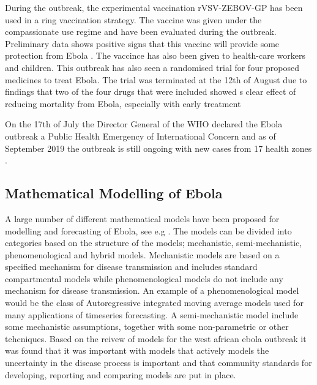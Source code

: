 \documentclass[12pt]{article}
\begin{document}
During the outbreak, the experimental vaccination rVSV-ZEBOV-GP has been used in a ring vaccination strategy. The vaccine was given under the compassionate use regime and have been evaluated during the outbreak. Preliminary data shows positive signs that this vaccine will provide some protection from Ebola \cite{organizationPreliminaryResultsEfficacy2019}. The vaccince has also been given to health-care workers and children. This outbreak has also seen a randomised trial for four proposed medicines to treat Ebola. The trial was terminated at the 12th of August due to findings that two of the four drugs that were included showed s clear effect of reducing mortality from Ebola, especially with early treatment \cite{nationalinstituteofallergyandinfectiousdiseasesIndependentMonitoringBoard2019}

On the 17th of July the Director General of the WHO declared the Ebola outbreak a Public Health Emergency of International Concern \cite{worldhealthorganizationEbolaOutbreakDRC2019} and as of September 2019 the outbreak is still ongoing with new cases from 17 health zones \cite{worldhealthorganizationEbolaOutbreakDRC2019b}. 

\subsection{Mathematical Modelling of Ebola}

A large number of different mathematical models have been proposed for modelling and forecasting of Ebola, see e.g \cite{chretienMathematicalModelingWest,viboudRAPIDDEbolaForecasting2018}. The models can be divided into categories based on the structure of the models; mechanistic, semi-mechanistic, phenomenological and hybrid models. Mechanistic models are based on a specified mechanism for disease transmission and includes standard compartmental models while phenomenological models do not include any mechanism for disease transmission. An example of a phenomenological model would be the class of Autoregressive integrated moving average models used for many applications of timeseries forecasting. A semi-mechanistic model include some mechanistic assumptions, together with some non-parametric or other tehcniques. Based on the reivew of models for the west african ebola outbreak it was found that it was important with models that actively models the uncertainty in the disease process is important \cite{chretienMathematicalModelingWest, kingAvoidableErrorsModelling2015} and that community standards for developing, reporting and comparing models are put in place. 
\end{document}
